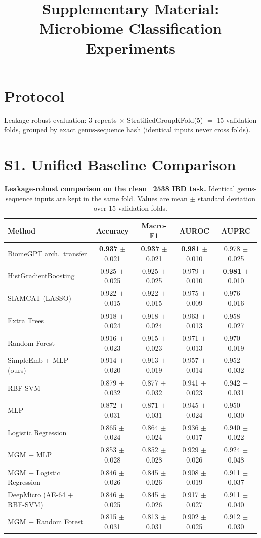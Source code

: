 \documentclass[11pt,a4paper]{article}
\title{Supplementary Material: Microbiome Classification Experiments}
\author{}
\date{}
\begin{document}
\maketitle

\section*{Protocol}
Leakage-robust evaluation: 3 repeats $\times$ StratifiedGroupKFold(5) $=$ 15 validation folds,
grouped by exact genus-sequence hash (identical inputs never cross folds).

\section*{S1. Unified Baseline Comparison}

\begin{table}[ht]
\centering
\caption{\textbf{Leakage-robust comparison on the clean\_2538 IBD task.}
Identical genus-sequence inputs are kept in the same fold.
Values are mean $\pm$ standard deviation over 15 validation folds.}
\label{tab:sup1}
\begin{tabular}{lcccc}
\toprule
\textbf{Method} & \textbf{Accuracy} & \textbf{Macro-F1} & \textbf{AUROC} & \textbf{AUPRC} \\
\midrule
BiomeGPT arch.\ transfer & \textbf{0.937} $\pm$ 0.021 & \textbf{0.937} $\pm$ 0.021 & \textbf{0.981} $\pm$ 0.010 & 0.978 $\pm$ 0.025 \\
HistGradientBoosting & 0.925 $\pm$ 0.025 & 0.925 $\pm$ 0.025 & 0.979 $\pm$ 0.010 & \textbf{0.981} $\pm$ 0.010 \\
SIAMCAT (LASSO) & 0.922 $\pm$ 0.015 & 0.922 $\pm$ 0.015 & 0.975 $\pm$ 0.009 & 0.976 $\pm$ 0.016 \\
Extra Trees & 0.918 $\pm$ 0.024 & 0.918 $\pm$ 0.024 & 0.963 $\pm$ 0.013 & 0.958 $\pm$ 0.027 \\
Random Forest & 0.916 $\pm$ 0.023 & 0.915 $\pm$ 0.023 & 0.971 $\pm$ 0.013 & 0.970 $\pm$ 0.019 \\
SimpleEmb + MLP (ours) & 0.914 $\pm$ 0.020 & 0.913 $\pm$ 0.019 & 0.957 $\pm$ 0.014 & 0.952 $\pm$ 0.032 \\
RBF-SVM & 0.879 $\pm$ 0.032 & 0.877 $\pm$ 0.032 & 0.941 $\pm$ 0.023 & 0.942 $\pm$ 0.031 \\
MLP & 0.872 $\pm$ 0.031 & 0.871 $\pm$ 0.031 & 0.945 $\pm$ 0.024 & 0.950 $\pm$ 0.030 \\
Logistic Regression & 0.865 $\pm$ 0.024 & 0.864 $\pm$ 0.024 & 0.936 $\pm$ 0.017 & 0.940 $\pm$ 0.022 \\
MGM + MLP & 0.853 $\pm$ 0.028 & 0.852 $\pm$ 0.028 & 0.929 $\pm$ 0.026 & 0.924 $\pm$ 0.048 \\
MGM + Logistic Regression & 0.846 $\pm$ 0.026 & 0.845 $\pm$ 0.026 & 0.908 $\pm$ 0.019 & 0.911 $\pm$ 0.037 \\
DeepMicro (AE-64 + RBF-SVM) & 0.846 $\pm$ 0.025 & 0.845 $\pm$ 0.026 & 0.917 $\pm$ 0.027 & 0.911 $\pm$ 0.040 \\
MGM + Random Forest & 0.815 $\pm$ 0.031 & 0.813 $\pm$ 0.031 & 0.902 $\pm$ 0.025 & 0.912 $\pm$ 0.030 \\
\bottomrule
\end{tabular}
\end{table}
\end{document}

